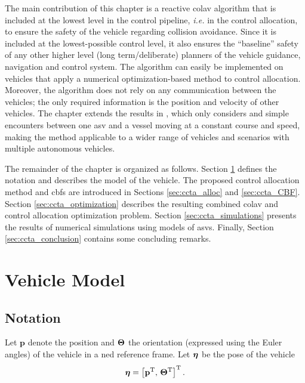 The main contribution of this chapter is a reactive \acrfull{colav} algorithm that is included at the lowest level in the control pipeline, \emph{i.e.} in the control allocation, to ensure the safety of the vehicle regarding collision avoidance.
Since it is included at the lowest-possible control level, it also ensures the ``baseline'' safety of any other higher level (long term/deliberate) planners of the vehicle guidance, navigation and control system.
The algorithm can easily be implemented on vehicles that apply a numerical optimization-based method to control allocation.
Moreover, the algorithm does not rely on any communication between the vehicles; the only required information is the position and velocity of other vehicles.
The chapter extends the results in \cite{thyri_reactive_2020}, which only considers  and simple encounters between one \gls{asv} and a vessel moving at a constant course and speed, making the method applicable to a wider range of vehicles and scenarios with multiple autonomous vehicles.

The remainder of the chapter is organized as follows.
Section \ref{sec:ccta_model} defines the notation and describes the model of the vehicle.
The proposed control allocation method and \glspl{cbf} are introduced in Sections \ref{sec:ccta_alloc} and \ref{sec:ccta_CBF}.
Section \ref{sec:ccta_optimization} describes the resulting combined \gls{colav} and control allocation optimization problem.
Section \ref{sec:ccta_simulations} presents the results of numerical simulations using models of \glspl{asv}.
Finally, Section \ref{sec:ccta_conclusion} contains some concluding remarks.

\section{Vehicle Model}
\label{sec:ccta_model}

\subsection{Notation}
\label{sec:ccta_notation}

Let $\mathbf{p}$ denote the position and $\bm{\Theta}$ the orientation (expressed using the Euler angles) of the vehicle in a \acrfull{ned} reference frame.
%
Let $\bm{\eta}$ be the pose of the vehicle
\begin{equation}
    \bm{\eta} = \left[ \mathbf{p}^{\rm T} ,\, \bm{\Theta}^{\rm T} \right]^{\rm T}.
\end{equation}

